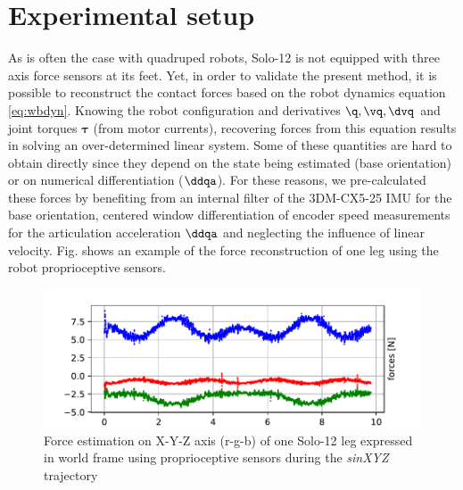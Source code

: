 \section{Experimental setup}
%  
As is often the case with quadruped robots, Solo-12 is not equipped with three axis force sensors at its feet. 
Yet, in order to validate the present method, it is possible to reconstruct the contact forces based on the robot dynamics 
equation \eqref{eq:wbdyn}. Knowing the robot configuration and derivatives $\q,\vq,\dvq$ and joint torques $\bm\tau$ (from motor currents), 
recovering forces from this equation results in solving an over-determined linear system. Some of these quantities are hard to obtain directly 
since they depend on the state being estimated (\eg base orientation) or on numerical differentiation ($\ddqa$). For these reasons, we pre-calculated 
these forces by benefiting from an internal filter of the 3DM-CX5-25 IMU for the base orientation, centered window differentiation of encoder speed 
measurements for the articulation acceleration $\ddqa$ and neglecting the influence of linear velocity. Fig.  shows an example of 
the force reconstruction of one leg using the robot proprioceptive sensors.
%
\begin{figure}
    \centering
    \includegraphics[width=0.9\columnwidth]{figures/centroidal/forces_solo_1leg.pdf}
    \caption{Force estimation on X-Y-Z axis (r-g-b) of one Solo-12 leg expressed in world frame using proprioceptive sensors during the \textit{sinXYZ} trajectory}
    \label{fig:force_est}
\end{figure}


